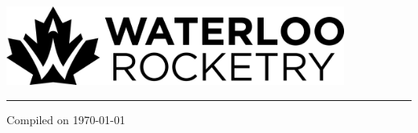 
\begin{center}
\vspace*{7cm}
\hspace{7em}\includegraphics[width=30em]{common/mono_horizontal_standard}
\newline
\rule{50em}{2pt}

\vspace{1cm}
\thetitle

\vspace*{\fill}
Compiled on \today
\end{center}
\newpage
